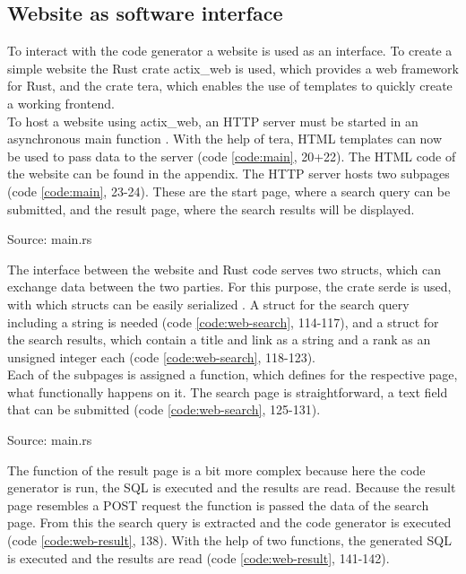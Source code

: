 \subsection{Website as software interface}
To interact with the code generator a website is used as an interface. To create a simple website the Rust crate actix\_web is used, which provides a web framework for Rust, and the crate tera, which enables the use of templates to quickly create a working frontend.\\
To host a website using actix\_web, an HTTP server must be started in an asynchronous main function \parencite[cf.][n.p.]{ede_actix_2022}. With the help of tera, HTML templates can now be used \parencite[cf.][n.p.]{prouillet_tera_2022} to pass data to the server (code \ref{code:main}, 20+22). The HTML code of the website can be found in the appendix. The HTTP server hosts two subpages (code \ref{code:main}, 23-24). These are the start page, where a search query can be submitted, and the result page, where the search results will be displayed.
\begin{codeenv}
    \label{code:main}
    
    \centerline{Source: main.rs}
\end{codeenv}
The interface between the website and Rust code serves two structs, which can exchange data between the two parties. For this purpose, the crate serde is used, with which structs can be easily serialized \parencite[cf.][n.p.]{tolnay_serde_2017}. A struct for the search query including a string is needed (code \ref{code:web-search}, 114-117), and a struct for the search results, which contain a title and link as a string and a rank as an unsigned integer each (code \ref{code:web-search}, 118-123).\\
Each of the subpages is assigned a function, which defines for the respective page, what functionally happens on it. The search page is straightforward, a text field that can be submitted (code \ref{code:web-search}, 125-131).
\begin{codeenv}
    \label{code:web-search}
    
    \centerline{Source: main.rs}
\end{codeenv}
The function of the result page is a bit more complex because here the code generator is run, the \ac{SQL} is executed and the results are read. Because the result page resembles a POST request the function is passed the data of the search page. From this the search query is extracted and the code generator is executed (code \ref{code:web-result}, 138). With the help of two functions, the generated \ac{SQL} is executed and the results are read (code \ref{code:web-result}, 141-142).\\
